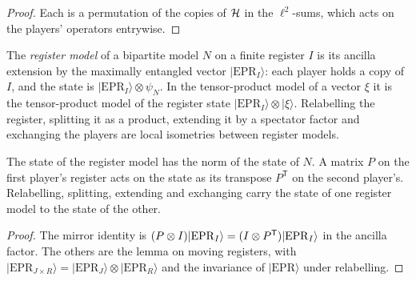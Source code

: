 \begin{proof}
\leanok
Each is a permutation of the copies of $\mathcal{H}$ in the $\ell^2$-sums, which acts on the players'
operators entrywise.
\end{proof}

\begin{definition}
\label{def:register-model}
\leanok
The \emph{register model} of a bipartite model $N$ on a finite register $I$ is its ancilla
extension by the maximally entangled vector $|\mathrm{EPR}_I\rangle$: each player holds a copy of
$I$, and the state is $|\mathrm{EPR}_I\rangle \otimes \psi_N$. In the tensor-product model of a
vector $\xi$ it is the tensor-product model of the register state
$|\mathrm{EPR}_I\rangle \otimes |\xi\rangle$. Relabelling the register, splitting it as a product,
extending it by a spectator factor and exchanging the players are local isometries between
register models.
\end{definition}

\begin{lemma}
\label{lem:register-model}
\leanok
The state of the register model has the norm of the state of $N$. A matrix $P$ on the first
player's register acts on the state as its transpose $P^{\mathsf T}$ on the second player's.
Relabelling, splitting, extending and exchanging carry the state of one register model to the
state of the other.
\end{lemma}

\begin{proof}
\leanok
The mirror identity is $(P \otimes I)|\mathrm{EPR}_I\rangle = (I \otimes P^{\mathsf T})
|\mathrm{EPR}_I\rangle$ in the ancilla factor. The others are the lemma on moving registers, with
$|\mathrm{EPR}_{J \times R}\rangle = |\mathrm{EPR}_J\rangle \otimes |\mathrm{EPR}_R\rangle$ and the
invariance of $|\mathrm{EPR}\rangle$ under relabelling.
\end{proof}

